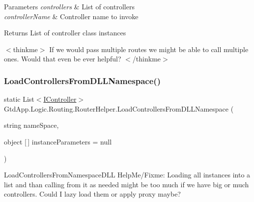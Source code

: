\begin{DoxyParams}{Parameters}
{\em controllers} & List of controllers\\
\hline
{\em controller\+Name} & Controller name to invoke\\
\hline
\end{DoxyParams}
\begin{DoxyReturn}{Returns}
List of controller class instances
\end{DoxyReturn}
$<$thinkme$>$ If we would pass multiple routes we might be able to call multiple ones. Would that even be ever helpful? $<$/thinkme$>$ \mbox{\label{class_gtd_app_1_1_logic_1_1_routing_1_1_router_helper_aa2d42769c4ecafc695851531d12e72d7}} 
\subsubsection{\texorpdfstring{Load\+Controllers\+From\+D\+L\+L\+Namespace()}{LoadControllersFromDLLNamespace()}}
{\footnotesize\ttfamily static List$<$\mbox{\hyperlink{interface_gtd_app_1_1_logic_1_1_interfaces_1_1_i_controller}{I\+Controller}}$>$ Gtd\+App.\+Logic.\+Routing.\+Router\+Helper.\+Load\+Controllers\+From\+D\+L\+L\+Namespace (\begin{DoxyParamCaption}\item[{string}]{name\+Space,  }\item[{object \mbox{[}$\,$\mbox{]}}]{instance\+Parameters = {\ttfamily null} }\end{DoxyParamCaption})\hspace{0.3cm}{\ttfamily [static]}}



Load\+Controllers\+From\+Namespace\+D\+LL Help\+Me/\+Fixme\+: Loading all instances into a list and than calling from it as needed might be too much if we have big or much controllers. Could I lazy load them or apply proxy maybe? 


